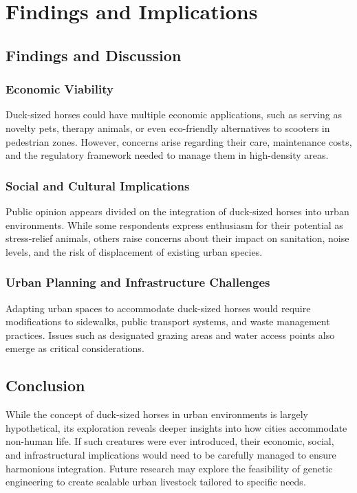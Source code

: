 \documentclass[12pt,a4paper]{report}
\begin{document}
\part{Findings and Implications}\label{sec:Findings_and_Implications}

\chapter{Findings and Discussion}\label{sec:Findings_and_Discussion}

\section{Economic Viability}\label{sec:Economic_Viability}

Duck-sized horses could have multiple economic applications, such as serving as novelty pets, therapy animals, or even eco-friendly alternatives to scooters in pedestrian zones. However, concerns arise regarding their care, maintenance costs, and the regulatory framework needed to manage them in high-density areas.

\section{Social and Cultural Implications}\label{sec:Social_and_Cultural_Implications}

Public opinion appears divided on the integration of duck-sized horses into urban environments. While some respondents express enthusiasm for their potential as stress-relief animals, others raise concerns about their impact on sanitation, noise levels, and the risk of displacement of existing urban species.

\section{Urban Planning and Infrastructure Challenges}\label{sec:Urban_Planning_and_Infrastructure_Challenges}

Adapting urban spaces to accommodate duck-sized horses would require modifications to sidewalks, public transport systems, and waste management practices. Issues such as designated grazing areas and water access points also emerge as critical considerations.

\chapter{Conclusion}\label{sec:Conclusion}

While the concept of duck-sized horses in urban environments is largely hypothetical, its exploration reveals deeper insights into how cities accommodate non-human life. If such creatures were ever introduced, their economic, social, and infrastructural implications would need to be carefully managed to ensure harmonious integration. Future research may explore the feasibility of genetic engineering to create scalable urban livestock tailored to specific needs.


                         


\printindex


\end{document}

